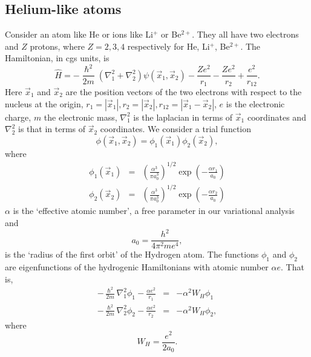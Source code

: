 \documentclass{article}
\numberwithin{equation}{section}
\begin{document}
\subsection{Helium-like atoms}
Consider an atom like He or ions like Li$^{+}$ or Be$^{2+}$. They all have
two electrons and $Z$ protons, where $Z = 2, 3, 4$ respectively for He, 
Li$^{+}$, Be$^{2+}$. The Hamiltonian, in cgs units, is
\begin{equation}\label{s3e1}
\hat{H} = -\frac{\hslash^2}{2m}\left(\nabla_1^2 + \nabla_2^2\right)
\psi(\vec{x}_1, \vec{x}_2)
- \frac{Ze^2}{r_1} - \frac{Ze^2}{r_2} + \frac{e^2}{r_{12}}.
\end{equation}
Here $\vec{x}_1$ and $\vec{x}_2$ are the position vectors of the two 
electrons with respect to the nucleus at the origin, $r_1 = |\vec{x}_1|, 
r_2 = |\vec{x}_2|, r_{12} = |\vec{x}_1 - \vec{x}_2|$, $e$ is the 
electronic charge, $m$ the electronic mass, $\nabla_1^2$ is the laplacian 
in terms of $\vec{x}_1$ coordinates and $\nabla_2^2$ is that in terms of 
$\vec{x}_2$ coordinates. We consider a trial function
\begin{equation}\label{s3e2}
\phi(\vec{x}_1, \vec{x}_2) = \phi_1(\vec{x}_1)\phi_2(\vec{x}_2),
\end{equation}
where
\begin{eqnarray}
\phi_1(\vec{x}_1) &=& \left(\frac{\alpha^3}{\pi a_0^3}\right)^{1/2}\exp
\left(-\frac{\alpha r_1}{a_0}\right) \\
\phi_2(\vec{x}_2) &=& \left(\frac{\alpha^3}{\pi a_0^3}\right)^{1/2}\exp
\left(-\frac{\alpha r_2}{a_0}\right)
\end{eqnarray}
$\alpha$ is the `effective atomic number', a free parameter in our 
variational analysis and 
\begin{equation}\label{s3e5}
a_0 = \frac{h^2}{4\pi^2 me^4},
\end{equation}
is the `radius of the first orbit' of the Hydrogen atom. The functions 
$\phi_1$ and $\phi_2$ are eigenfunctions of the hydrogenic Hamiltonians 
with atomic number $\alpha e$. That is,
\begin{eqnarray}
-\frac{\hslash^2}{2m}\nabla_1^2\phi_1 - \frac{\alpha e^2}{r_1} &=& 
-\alpha^2W_H\phi_1 \label{s3e6} \\
-\frac{\hslash^2}{2m}\nabla_2^2\phi_2 - \frac{\alpha e^2}{r_2} &=& 
-\alpha^2W_H\phi_2 \label{s3e7}, 
\end{eqnarray}
where 
\begin{equation}\label{s3e8}
W_H = \frac{e^2}{2a_0}.
\end{equation}
\end{document}
